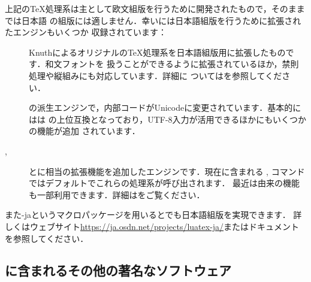 \documentclass[uplatex,dvipdfmx]{jsarticle}
\begin{document}
%
上記の\TeX 処理系は主として欧文組版を行うために開発されたもので，そのままでは日本語
の組版には適しません．幸い\TL には日本語組版を行うために拡張されたエンジンもいくつか
収録されています：
%
\begin{description}
\item[\pTeX]
Knuthによるオリジナルの\TeX 処理系を日本語組版用に拡張したものです．和文フォントを
扱うことができるように拡張されているほか，禁則処理や縦組みにも対応しています．詳細に
ついてはを参照してください．

\item[\upTeX]
\pTeX の派生エンジンで，内部コードがUnicodeに変更されています．基本的には\upTeX は
\pTeX の上位互換となっており，UTF-8入力が活用できるほかにもいくつかの機能が追加
されています．

\item[\epTeX, \eupTeX]
\pTeX と\upTeX に\eTeX 相当の拡張機能を追加したエンジンです．現在\TL に含まれる
, コマンドではデフォルトでこれらの処理系が呼び出されます．
最近は\pdfTeX 由来の機能も一部利用できます．詳細はをご覧ください．
\end{description}
%
また\LuaTeX-jaというマクロパッケージを用いると\LuaTeX でも日本語組版を実現できます．
詳しくはウェブサイト\url{https://ja.osdn.net/projects/luatex-ja/}またはドキュメント
を参照してください．

\subsection{\TL に含まれるその他の著名なソフトウェア}
\end{document}
